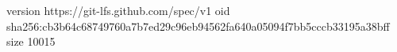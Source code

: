 version https://git-lfs.github.com/spec/v1
oid sha256:cb3b64c68749760a7b7ed29c96eb94562fa640a05094f7bb5cccb33195a38bff
size 10015
